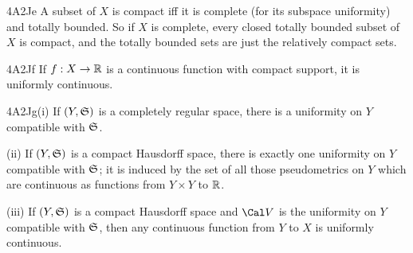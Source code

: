 \spheader 4A2Je A subset of $X$ is compact iff it is
complete (for its subspace uniformity) and
totally bounded.
So if $X$ is complete, every closed totally bounded subset of $X$ is
compact, and the totally bounded sets are just the relatively compact
sets.

\spheader 4A2Jf If $f:X\to\Bbb R$ is a continuous function with compact
support, it is uniformly continuous.

\spheader 4A2Jg(i) 
If $(Y,\frak S)$ is a completely regular space,
there is a uniformity on $Y$ compatible with $\frak S$.

\quad(ii) If $(Y,\frak S)$ is a compact
Hausdorff space, there is exactly one
uniformity on $Y$ compatible with $\frak S$;  it is induced by the set
of all those pseudometrics on $Y$ which are continuous as functions from
$Y\times Y$ to $\Bbb R$.

\quad(iii) If $(Y,\frak S)$ is a compact Hausdorff space and $\Cal V$ is
the uniformity on $Y$ compatible with $\frak S$, then any continuous
function from $Y$ to $X$ is uniformly continuous.

